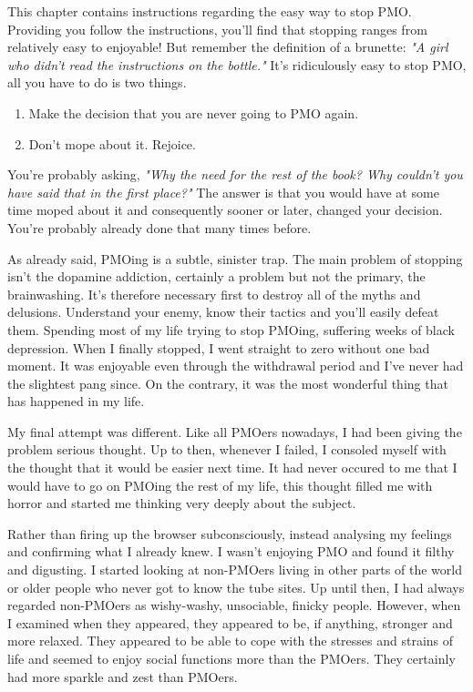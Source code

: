 \documentclass[easypeasy]{subfiles}
\begin{document}
This chapter contains instructions regarding the easy way to stop PMO. Providing you follow the instructions, you'll find that stopping ranges from relatively easy to enjoyable! But remember the definition of a brunette: \textit{"A girl who didn't read the instructions on the bottle."} It's ridiculously easy to stop PMO, all you have to do is two things.

\begin{enumerate}
  \item Make the decision that you are never going to PMO again.
  \item Don't mope about it. Rejoice.
\end{enumerate}

You're probably asking, \textit{"Why the need for the rest of the book? Why couldn't you have said that in the first place?"} The answer is that you would have at some time moped about it and consequently sooner or later, changed your decision. You're probably already done that many times before.

As already said, PMOing is a subtle, sinister trap. The main problem of stopping isn't the dopamine addiction, certainly a problem but not the primary, the brainwashing. It's therefore necessary first to destroy all of the myths and delusions. Understand your enemy, know their tactics and you'll easily defeat them. Spending most of my life trying to stop PMOing, suffering weeks of black depression. When I finally stopped, I went straight to zero without one bad moment. It was enjoyable even through the withdrawal period and I've never had the slightest pang since. On the contrary, it was the most wonderful thing that has happened in my life.

My final attempt was different. Like all PMOers nowadays, I had been giving the problem serious thought. Up to then, whenever I failed, I consoled myself with the thought that it would be easier next time. It had never occured to me that I would have to go on PMOing the rest of my life, this thought filled me with horror and started me thinking very deeply about the subject.

Rather than firing up the browser subconsciously, instead analysing my feelings and confirming what I already knew. I wasn't enjoying PMO and found it filthy and digusting. I started looking at non-PMOers living in other parts of the world or older people who never got to know the tube sites. Up until then, I had always regarded non-PMOers as wishy-washy, unsociable, finicky people. However, when I examined when they appeared, they appeared to be, if anything, stronger and more relaxed. They appeared to be able to cope with the stresses and strains of life and seemed to enjoy social functions more than the PMOers. They certainly had more sparkle and zest than PMOers.
\end{document}
